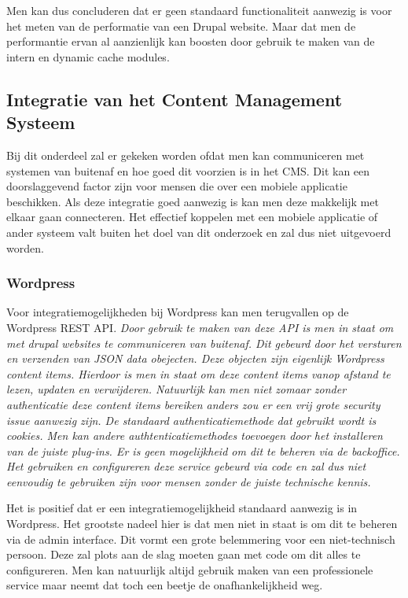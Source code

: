 Men kan dus concluderen dat er geen standaard functionaliteit aanwezig is voor het meten van de performatie van een Drupal website. Maar dat men de performantie ervan al aanzienlijk kan boosten door gebruik te maken van de intern en dynamic cache modules.

\subsection{Integratie van het Content Management Systeem}
Bij dit onderdeel zal er gekeken worden ofdat men kan communiceren met systemen van buitenaf en hoe goed dit voorzien is in het CMS. Dit kan een doorslaggevend factor zijn voor mensen die over een mobiele applicatie beschikken. Als deze integratie goed aanwezig is kan men deze makkelijk met elkaar gaan connecteren. Het effectief koppelen met een mobiele applicatie of ander systeem valt buiten het doel van dit onderzoek en zal dus niet uitgevoerd worden.
\subsubsection{Wordpress}
Voor integratiemogelijkheden bij Wordpress kan men terugvallen op de Wordpress REST API.\textit{ Door gebruik te maken van deze API is men in staat om met drupal websites te communiceren van buitenaf. Dit gebeurd door het versturen en verzenden van JSON data obejecten. Deze objecten zijn eigenlijk Wordpress content items. Hierdoor is men in staat om deze content items vanop afstand te lezen, updaten en verwijderen. Natuurlijk kan men niet zomaar zonder authenticatie deze content items bereiken anders zou er een vrij grote security issue aanwezig zijn. De standaard authenticatiemethode dat gebruikt wordt is cookies. Men kan andere authtenticatiemethodes toevoegen door het installeren van de juiste plug-ins. Er is geen mogelijkheid om dit te beheren via de backoffice. Het gebruiken en configureren deze service gebeurd via code en zal dus niet eenvoudig te gebruiken zijn voor mensen zonder de juiste technische kennis.} \autocite{WordpressCommunity2019b,WordpressCommunity2019d}

Het is positief dat er een integratiemogelijkheid standaard aanwezig is in Wordpress. Het grootste nadeel hier is dat men niet in staat is om dit te beheren via de admin interface. Dit vormt een grote belemmering voor een niet-technisch persoon. Deze zal plots aan de slag moeten gaan met code om dit alles te configureren. Men kan natuurlijk altijd gebruik maken van een professionele service maar neemt dat toch een beetje de onafhankelijkheid weg.
